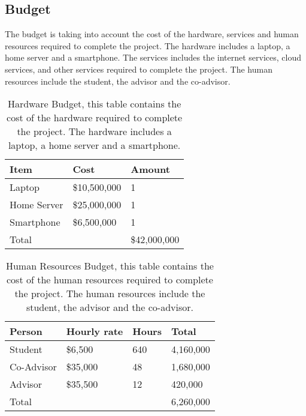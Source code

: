 \subsection{Budget}

The budget is taking into account the cost of the hardware, services and human resources required to complete the project. The hardware includes a laptop, a home server and a smartphone. The services includes the internet services, cloud services, and other services required to complete the project. The human resources include the student, the advisor and the co-advisor.


\begin{table}[h]
    \centering
        \begin{tabularx}{\textwidth}{|m{5.5cm}|X|X|}
            \hline
            Item & Cost & Amount \\
            \hline
            Laptop & \$10,500,000 & 1 \\
            \hline
            Home Server & \$25,000,000 & 1 \\
            \hline
            Smartphone & \$6,500,000 & 1 \\
            \hline
            Total & & \$42,000,000 \\
            \hline
        \end{tabularx}
    \caption{
        Hardware Budget, this table contains the cost of the hardware required to complete the project. The hardware includes a laptop, a home server and a smartphone.
    }
\end{table}

\begin{table}[h]
    \centering
        \begin{tabularx}{\textwidth}{|m{3.5cm}|X|X|X| }
            \hline
            Person & Hourly rate & Hours & Total\\
            \hline
            Student & \$6,500 & 640 & 4,160,000 \\
            \hline
            Co-Advisor & \$35,000 & 48 & 1,680,000\\
            \hline
            Advisor & \$35,500 & 12 & 420,000\\
            \hline
            Total & & & 6,260,000\\
            \hline
        \end{tabularx}
    \caption{Human Resources Budget, this table contains the cost of the human resources required to complete the project. The human resources include the student, the advisor and the co-advisor.}
\end{table}

